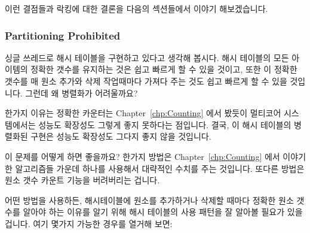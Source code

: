 이런 결점들과 락킹에 대한 결론을 다음의 섹션들에서 이야기 해보겠습니다.

\subsubsection{Partitioning Prohibited}
\label{sec:locking:Partitioning Prohibited}

싱글 쓰레드로 해시 테이블을 구현하고 있다고 생각해 봅시다.
해시 테이블의 모든 아이템의 정확한 갯수를 유지하는 것은 쉽고 빠르게 할 수 있을
것이고, 또한 이 정확한 갯수를 매 원소 추가와 삭제 작업때마다 가져다 주는 것도
쉽고 빠르게 할 수 있을 것입니다.
그런데 왜 병렬화가 어려울까요?

한가지 이유는 정확한 카운터는 Chapter~\ref{chp:Counting} 에서 봤듯이 멀티코어
시스템에서는 성능도 확장성도 그렇게 좋지 못하다는 점입니다.
결국, 이 해시 테이블의 병렬화된 구현은 성능도 확장성도 그다지 좋지 않을
것입니다.

이 문제를 어떻게 하면 좋을까요?
한가지 방법은 Chapter~\ref{chp:Counting} 에서 이야기한 알고리즘들 가운데 하나를
사용해서 대략적인 수치를 주는 것입니다.
또다른 방법은 원소 갯수 카운트 기능을 버려버리는 겁니다.

어떤 방법을 사용하든, 해시테이블에 원소를 추가하거나 삭제할 때마다 정확한 원소
갯수를 알아야 하는 이유를 알기 위해 해시 테이블의 사용 패턴을 잘 알아볼 필요가
있을 겁니다.
여기 몇가지 가능한 경우를 열거해 보면:

